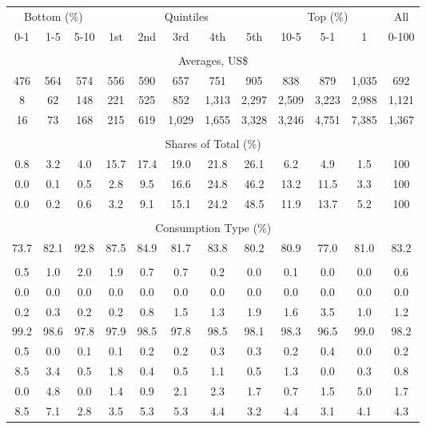 \begin{tabular}{c c c| c c c c c| c c c| c}
\toprule
\multicolumn{3}{c|}{Bottom (\%)} & \multicolumn{5}{c|}{Quintiles} & \multicolumn{3}{c|}{Top (\%)} & All  \\
0-1 & 1-5 & 5-10 &  1st & 2nd & 3rd & 4th & 5th & 10-5 & 5-1 & 1 & 0-100 \\
\midrule \\
\multicolumn{12}{c}{Averages, US\$} \\
\midrule
476  & 564  & 574  & 556  & 590  & 657  & 751  & 905  & 838  & 879  & 1,035  & 692 \\
8 & 62 & 148 & 221 & 525 & 852 & 1,313 & 2,297 & 2,509 & 3,223 & 2,988 & 1,121 \\
16 & 73 & 168 & 215 & 619 & 1,029 & 1,655 & 3,328 & 3,246 & 4,751 & 7,385 & 1,367 \\
\midrule \\
\multicolumn{12}{c}{Shares of Total (\%)} \\
\midrule
0.8   & 3.2   & 4.0   & 15.7   & 17.4   & 19.0   & 21.8   & 26.1   & 6.2   & 4.9   & 1.5   & 100 \\
0.0  & 0.1  & 0.5  & 2.8  & 9.5  & 16.6  & 24.8  & 46.2  & 13.2  & 11.5  & 3.3  & 100 \\
0.0  & 0.2  & 0.6  & 3.2  & 9.1  & 15.1  & 24.2  & 48.5  & 11.9  & 13.7  & 5.2  & 100 \\
\midrule \\
\multicolumn{12}{c}{Consumption Type (\%)}  \\
\midrule
73.7 & 82.1 & 92.8 & 87.5 & 84.9 & 81.7 & 83.8 & 80.2 & 80.9 & 77.0 & 81.0 & 83.2 \\
 & & & & & & & & & & &  \\
0.5 & 1.0 & 2.0 & 1.9 & 0.7 & 0.7 & 0.2 & 0.0 & 0.1 & 0.0 & 0.0 & 0.6 \\
0.0 & 0.0 & 0.0 & 0.0 & 0.0 & 0.0 & 0.0 & 0.0 & 0.0 & 0.0 & 0.0 & 0.0 \\
0.2 & 0.3 & 0.2 & 0.2 & 0.8 & 1.5 & 1.3 & 1.9 & 1.6 & 3.5 & 1.0 & 1.2 \\
99.2 & 98.6 & 97.8 & 97.9 & 98.5 & 97.8 & 98.5 & 98.1 & 98.3 & 96.5 & 99.0 & 98.2 \\
0.5 & 0.0 & 0.1 & 0.1 & 0.2 & 0.2 & 0.3 & 0.3 & 0.2 & 0.4 & 0.0 & 0.2 \\
8.5 & 3.4 & 0.5 & 1.8 & 0.4 & 0.5 & 1.1 & 0.5 & 1.3 & 0.0 & 0.3 & 0.8 \\
0.0 & 4.8 & 0.0 & 1.4 & 0.9 & 2.1 & 2.3 & 1.7 & 0.7 & 1.5 & 5.0 & 1.7 \\
8.5 & 7.1 & 2.8 & 3.5 & 5.3 & 5.3 & 4.4 & 3.2 & 4.4 & 3.1 & 4.1 & 4.3 \\

\end{tabular}
